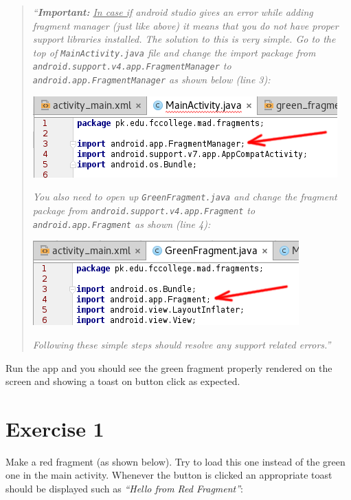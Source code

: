 \begin{quote}
	\textit{``\textbf{Important:} \underline{In case if} android studio gives an error while adding fragment manager (just like above) it means that you do not have proper support libraries installed. The solution to this is very simple. Go to the top of \texttt{MainActivity.java} file and change the import package from \texttt{android.support.v4.app.FragmentManager} to \texttt{android.app.FragmentManager} as shown below (line 3):}

	\begin{center}
		\includegraphics[scale=\SourceCodeScale]{chapters/ch11/images/17}
	\end{center}
	
	\textit{You also need to open up \texttt{GreenFragment.java} and change the fragment package from \texttt{android.support.v4.app.Fragment} to \texttt{android.app.Fragment} as shown (line 4):}
	
	\begin{center}
		\includegraphics[scale=\SourceCodeScale]{chapters/ch11/images/18}
	\end{center}
	
	\textit{Following these simple steps should resolve any support related errors.''}
\end{quote}

Run the app and you should see the green fragment properly rendered on the screen and showing a toast on button click as expected.

\section{Exercise 1}

Make a red fragment (as shown below). Try to load this one instead of the green one in the main activity. Whenever the button is clicked an appropriate toast should be displayed such as \textit{``Hello from Red Fragment''}:
	
